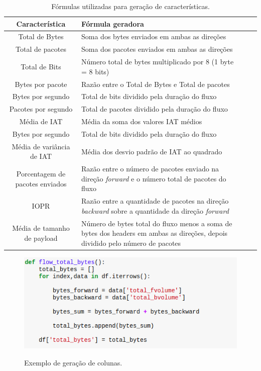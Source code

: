 \begin{table}[ht]
\centering
\begin{tabular}{|c p{10cm}|l p{10cm}}
\hline
\textbf{\small Característica} & \textbf{\small Fórmula geradora}\\\hline \hline
{\small Total de Bytes} & {\small Soma dos bytes enviados em ambas as direções}\\\hline
{\small Total de pacotes} & {\small Soma dos pacotes enviados em ambas as direções}\\\hline
{\small Total de Bits} & {\small Número total de bytes multiplicado por 8 (1 byte = 8 bits)}\\\hline
{\small Bytes por pacote} & {\small Razão entre o Total de Bytes e Total de pacotes}\\\hline
{\small Bytes por segundo} & {\small Total de bits dividido pela duração do fluxo}\\\hline
{\small Pacotes por segundo} & {\small Total de pacotes dividido pela duração do fluxo}\\\hline
{\small Média de IAT} & {\small Média da soma dos valores IAT médios}\\\hline
{\small Bytes por segundo} & {\small Total de bits dividido pela duração do fluxo}\\\hline
{\small Média de variância de IAT} & {\small Média dos desvio padrão de IAT ao quadrado}\\\hline
{\small Porcentagem de pacotes enviados} & {\small Razão entre o número de pacotes enviado na direção \textit{forward} e o número total de pacotes do fluxo}\\\hline
{\small IOPR} & {\small Razão entre a quantidade de pacotes na direção \textit{backward} sobre a quantidade da direção \textit{forward}}\\\hline
{\small Média de tamanho de payload} & {\small Número de bytes total do fluxo menos a soma de bytes dos headers em ambas as direções, depois dividido pelo número de pacotes}\\\hline
\end{tabular}
\caption{Fórmulas utilizadas para geração de características.}
\label{t.caracteristicas-geradas}
\end{table}

\begin{figure}[h]
\caption{\small Exemplo de geração de colunas.}
\centering
\includegraphics[scale=0.40]{figs/exemplo-geracao-coluna.png}
\label{f.exemplo-colunas}
\end{figure}

